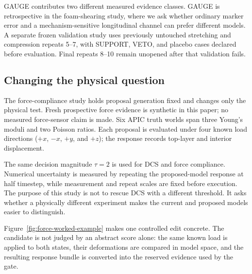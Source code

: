\documentclass[acmtog]{acmart}
\begin{document}
GAUGE contributes two different measured evidence classes. GAUGE is retrospective in the foam-shearing study, where we ask whether ordinary marker error and a mechanism-sensitive longitudinal channel can prefer different models. A separate frozen validation study uses previously untouched stretching and compression repeats 5--7, with SUPPORT, VETO, and placebo cases declared before evaluation. Final repeats 8--10 remain unopened after that validation fails.

\subsection{Changing the physical question}\label{fresh-orthogonal-force-compliance-study}

The force-compliance study holds proposal generation fixed and changes only the physical test. Fresh prospective force evidence is synthetic in this paper; no measured force-sensor claim is made. Six APIC truth worlds span three Young's moduli and two Poisson ratios. Each proposal is evaluated under four known load directions (\(+x\), \(-x\), \(+y\), and \(+z\)); the response records top-layer and interior displacement.

The same decision magnitude \(\tau=2\) is used for DCS and force compliance. Numerical uncertainty is measured by repeating the proposed-model response at half timestep, while measurement and repeat scales are fixed before execution. The purpose of this study is not to rescue DCS with a different threshold. It asks whether a physically different experiment makes the current and proposed models easier to distinguish.

Figure~\ref{fig:force-worked-example} makes one controlled edit concrete. The candidate is not judged by an abstract score alone: the same known load is applied to both states, their deformations are compared in model space, and the resulting response bundle is converted into the reserved evidence used by the gate.
\end{document}
